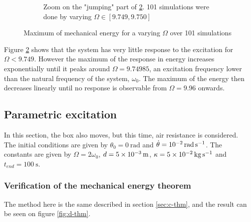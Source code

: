 \documentclass[a4paper,12pt,twoside]{article}
\begin{document}
\begin{figure}[h]
\begin{subfigure}[t]{0.45\textwidth}
		\caption{Zoom on the "jumping" part of \ref{fig:c-emax}. \num{101} simulations were done by varying $\Omega\in\left[9.749, 9.750 \right]$}
		\label{fig:c-emax-zoom}
	\end{subfigure}
	\caption{Maximum of mechanical energy for a varying $\Omega$ over 101 simulations}
	\label{fig:c-emax}
\end{figure}

Figure \ref{fig:c-emax} shows that the system has very little response to the excitation for $\Omega<9.749$. However the maximum of the response in energy increases exponentially until it peaks around $\Omega= 9.74985$, an excitation frequency lower than the natural frequency of the system, $\omega_0$. The maximum of the energy then decreases linearly until no response is observable from $\Omega=9.96$ onwards.


\subsection{Parametric excitation}

In this section, the box also moves, but this time, air resistance is considered.
The initial conditions are given by $\theta_0 = \SI{0}{\radian}$ and $\dot{\theta} = \SI{d-2}{\radian\per\second}$.
The constants are given by $\Omega = 2\omega_0$, $d = \SI{5d-3}{\m}$, $\kappa = \SI{5d-2}{\kg\per\s}$ and $t_{end} = \SI{100}{\s}$.

\subsubsection{Verification of the mechanical energy theorem}\label{sec:d-thm}

The method here is the same described in section \ref{sec:c-thm}, and the result can be seen on figure \ref{fig:d-thm}.
\end{document}
